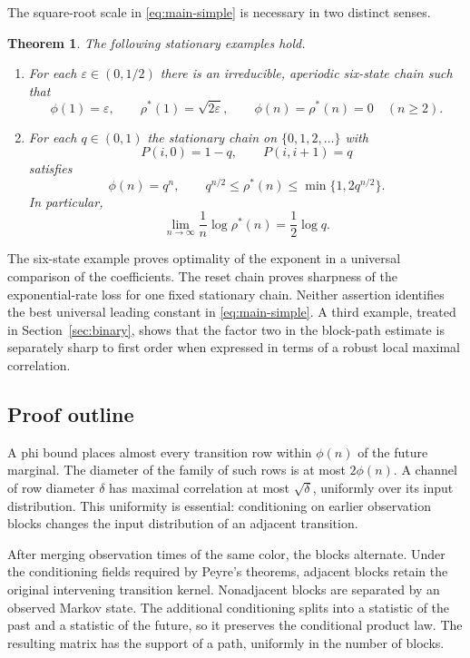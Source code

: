 \documentclass[11pt]{amsart}
\numberwithin{equation}{section}
\newtheorem{theorem}{Theorem}[section]
\theoremstyle{definition}
\newcommand{\rhostar}{\rho^{*}}
\begin{document}
The square-root scale in \eqref{eq:main-simple} is necessary in two distinct senses.

\begin{theorem}\label{thm:sharpness-summary}
The following stationary examples hold.
\begin{enumerate}
\item For each $\varepsilon\in(0,1/2)$ there is an irreducible, aperiodic six-state chain such that
\[
\phi(1)=\varepsilon,\qquad \rhostar(1)=\sqrt{2\varepsilon},
\qquad \phi(n)=\rhostar(n)=0\quad(n\ge2).
\]
\item For each $q\in(0,1)$ the stationary chain on $\{0,1,2,\ldots\}$ with
\[
P(i,0)=1-q,\qquad P(i,i+1)=q
\]
satisfies
\[
\phi(n)=q^n,\qquad q^{n/2}\le\rhostar(n)\le\min\{1,2q^{n/2}\}.
\]
In particular,
\[
\lim_{n\to\infty}\frac{1}{n}\log\rhostar(n)=\frac12\log q.
\]
\end{enumerate}
\end{theorem}

The six-state example proves optimality of the exponent in a universal comparison of the coefficients. The reset chain proves sharpness of the exponential-rate loss for one fixed stationary chain. Neither assertion identifies the best universal leading constant in \eqref{eq:main-simple}. A third example, treated in Section~\ref{sec:binary}, shows that the factor two in the block-path estimate is separately sharp to first order when expressed in terms of a robust local maximal correlation.

\subsection*{Proof outline}
A phi bound places almost every transition row within $\phi(n)$ of the future marginal. The diameter of the family of such rows is at most $2\phi(n)$. A channel of row diameter $\delta$ has maximal correlation at most $\sqrt\delta$, uniformly over its input distribution. This uniformity is essential: conditioning on earlier observation blocks changes the input distribution of an adjacent transition.

After merging observation times of the same color, the blocks alternate. Under the conditioning fields required by Peyre's theorems, adjacent blocks retain the original intervening transition kernel. Nonadjacent blocks are separated by an observed Markov state. The additional conditioning splits into a statistic of the past and a statistic of the future, so it preserves the conditional product law. The resulting matrix has the support of a path, uniformly in the number of blocks.
\end{document}
